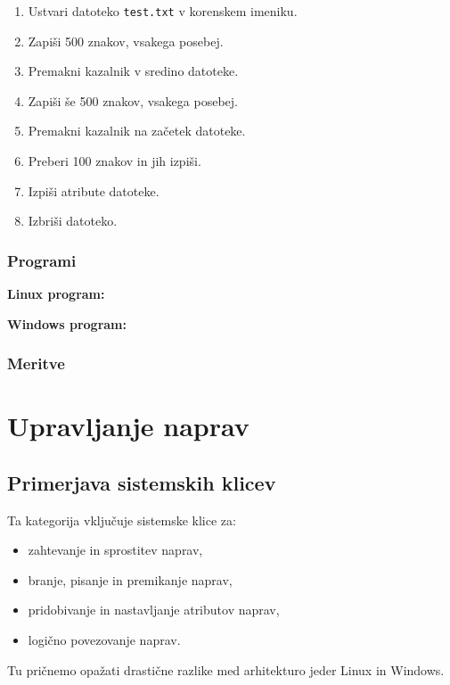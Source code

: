 \documentclass[a4paper,12pt,openright]{book}
\begin{document}
\begin{enumerate}
	\item Ustvari datoteko \texttt{test.txt} v korenskem imeniku.
	\item Zapiši 500 znakov, vsakega posebej.
	\item Premakni kazalnik v sredino datoteke.
	\item Zapiši še 500 znakov, vsakega posebej.
	\item Premakni kazalnik na začetek datoteke.
	\item Preberi 100 znakov in jih izpiši.
	\item Izpiši atribute datoteke.
	\item Izbriši datoteko.
\end{enumerate}

\subsection{Programi}

\textbf{Linux program:}


\textbf{Windows program:}


\subsection{Meritve}

\chapter{Upravljanje naprav}

\section{Primerjava sistemskih klicev}

Ta kategorija vključuje sistemske klice za:
\begin{itemize}
	\item zahtevanje in sprostitev naprav,
	\item branje, pisanje in premikanje naprav,
	\item pridobivanje in nastavljanje atributov naprav,
	\item logično povezovanje naprav.\cite{Silberschatz_Galvin_Gagne_2018}
\end{itemize}

Tu pričnemo opažati drastične razlike med arhitekturo jeder Linux in Windows.
\end{document}
